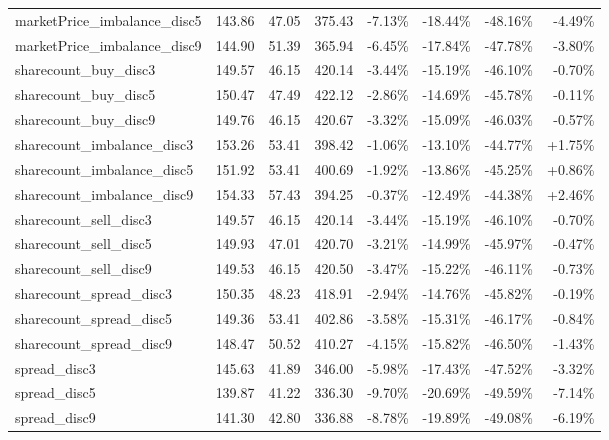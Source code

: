 \begin{table}[ht]
{\begin{tabular}{lRRR|RRRR}
marketPrice\_imbalance\_disc5        &    143.86 &   47.05 &  375.43 &   -7.13\% &  -18.44\% &  -48.16\% &       -4.49\% \\
marketPrice\_imbalance\_disc9        &    144.90 &   51.39 &  365.94 &   -6.45\% &  -17.84\% &  -47.78\% &       -3.80\% \\
sharecount\_buy\_disc3           &    149.57 &   46.15 &  420.14 &   -3.44\% &  -15.19\% &  -46.10\% &       -0.70\% \\
sharecount\_buy\_disc5           &    150.47 &   47.49 &  422.12 &   -2.86\% &  -14.69\% &  -45.78\% &       -0.11\% \\
sharecount\_buy\_disc9           &    149.76 &   46.15 &  420.67 &   -3.32\% &  -15.09\% &  -46.03\% &       -0.57\% \\
sharecount\_imbalance\_disc3     &    153.26 &   53.41 &  398.42 &   -1.06\% &  -13.10\% &  -44.77\% &        +1.75\% \\
sharecount\_imbalance\_disc5     &    151.92 &   53.41 &  400.69 &   -1.92\% &  -13.86\% &  -45.25\% &        +0.86\% \\
sharecount\_imbalance\_disc9     &    154.33 &   57.43 &  394.25 &   -0.37\% &  -12.49\% &  -44.38\% &        +2.46\% \\
sharecount\_sell\_disc3          &    149.57 &   46.15 &  420.14 &   -3.44\% &  -15.19\% &  -46.10\% &       -0.70\% \\
sharecount\_sell\_disc5          &    149.93 &   47.01 &  420.70 &   -3.21\% &  -14.99\% &  -45.97\% &       -0.47\% \\
sharecount\_sell\_disc9          &    149.53 &   46.15 &  420.50 &   -3.47\% &  -15.22\% &  -46.11\% &       -0.73\% \\
sharecount\_spread\_disc3        &    150.35 &   48.23 &  418.91 &   -2.94\% &  -14.76\% &  -45.82\% &       -0.19\% \\
sharecount\_spread\_disc5        &    149.36 &   53.41 &  402.86 &   -3.58\% &  -15.31\% &  -46.17\% &       -0.84\% \\
sharecount\_spread\_disc9        &    148.47 &   50.52 &  410.27 &   -4.15\% &  -15.82\% &  -46.50\% &       -1.43\% \\
spread\_disc3                   &    145.63 &   41.89 &  346.00 &   -5.98\% &  -17.43\% &  -47.52\% &       -3.32\% \\
spread\_disc5                   &    139.87 &   41.22 &  336.30 &   -9.70\% &  -20.69\% &  -49.59\% &       -7.14\% \\
spread\_disc9                   &    141.30 &   42.80 &  336.88 &   -8.78\% &  -19.89\% &  -49.08\% &       -6.19\% \\

\end{tabular}}
\end{table}
